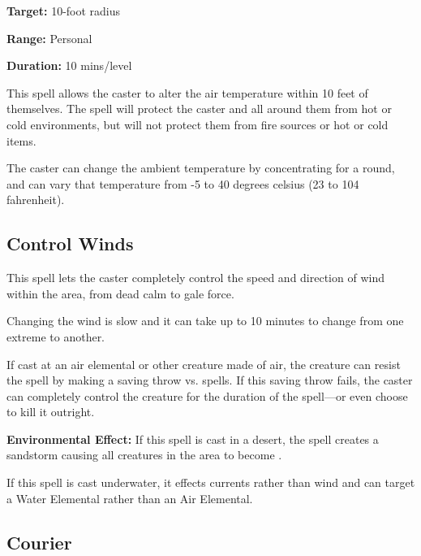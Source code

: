 \begin{multicols*}{2}
{\textbf{Target:} 10-foot radius

\textbf{Range:} Personal

\textbf{Duration:} 10 mins/level}

This spell allows the caster to alter the air temperature within 10 feet of themselves. The spell will protect the caster and all around them from hot or cold environments, but will not protect them from fire sources or hot or cold items.

The caster can change the ambient temperature by concentrating for a round, and can vary that temperature from -5 to 40 degrees celsius (23 to 104 fahrenheit).

\subsection{Control Winds}\label{spell:Control Winds}

This spell lets the caster completely control the speed and direction of wind within the area, from dead calm to gale force.

Changing the wind is slow and it can take up to 10 minutes to change from one extreme to another.

If cast at an air elemental or other creature made of air, the creature can resist the spell by making a saving throw vs. spells. If this saving throw fails, the caster can completely control the creature for the duration of the spell—or even choose to kill it outright.

\textbf{Environmental Effect:} If this spell is cast in a desert, the spell creates a sandstorm causing all creatures in the area to become .

If this spell is cast underwater, it effects currents rather than wind and can target a Water Elemental rather than an Air Elemental.

\subsection{Courier}\label{spell:Courier}
\end{multicols*}
